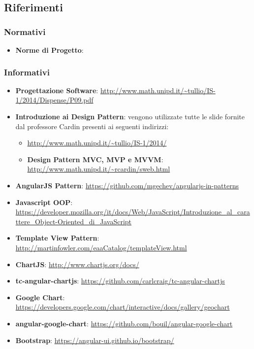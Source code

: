 	\subsection{Riferimenti} %
	\label{sub:riferimenti}
		\subsubsection{Normativi} %
		\label{ssub:normativi}
			\begin{itemize}
				\item \textbf{Norme di Progetto}: \docNameVersionNdP
			\end{itemize}

		\subsubsection{Informativi} %
		\label{ssub:informativi}
			\begin{itemize}
				\item \textbf{Progettazione Software}: \url{http://www.math.unipd.it/~tullio/IS-1/2014/Dispense/P09.pdf}
				\item \textbf{Introduzione ai Design Pattern}: vengono utilizzate tutte le slide fornite dal professore Cardin presenti ai seguenti indirizzi:
					\begin{itemize}
						\item \url{http://www.math.unipd.it/~tullio/IS-1/2014/}
						\item \textbf{Design Pattern MVC, MVP e MVVM}: \url{http://www.math.unipd.it/~rcardin/sweb.html}
					\end{itemize}
				\item \textbf{AngularJS Pattern}: \url{https://github.com/mgechev/angularjs-in-patterns}
				\item \textbf{Javascript OOP}: \url{https://developer.mozilla.org/it/docs/Web/JavaScript/Introduzione_al_carattere_Object-Oriented_di_JavaScript}
				\item \textbf{Template View Pattern}: \url{http://martinfowler.com/eaaCatalog/templateView.html}
				\item \textbf{ChartJS}: \url{http://www.chartjs.org/docs/}
				\item \textbf{tc-angular-chartjs}: \url{https://github.com/carlcraig/tc-angular-chartjs}
				\item \textbf{Google Chart}: \url{https://developers.google.com/chart/interactive/docs/gallery/geochart}
				\item \textbf{angular-google-chart}: \url{https://github.com/bouil/angular-google-chart}
				\item \textbf{Bootstrap}: \url{https://angular-ui.github.io/bootstrap/}
			\end{itemize}
